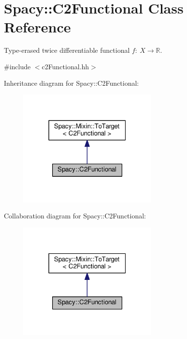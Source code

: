 \hypertarget{classSpacy_1_1C2Functional}{}\section{Spacy\+:\+:C2\+Functional Class Reference}
\label{classSpacy_1_1C2Functional}


Type-\/erased twice differentiable functional $f:\ X \to \mathbb{R} $.  




{\ttfamily \#include $<$c2\+Functional.\+hh$>$}



Inheritance diagram for Spacy\+:\+:C2\+Functional\+:\nopagebreak
\begin{figure}[H]
\begin{center}
\leavevmode
\includegraphics[width=199pt]{classSpacy_1_1C2Functional__inherit__graph}
\end{center}
\end{figure}


Collaboration diagram for Spacy\+:\+:C2\+Functional\+:\nopagebreak
\begin{figure}[H]
\begin{center}
\leavevmode
\includegraphics[width=199pt]{classSpacy_1_1C2Functional__coll__graph}
\end{center}
\end{figure}
